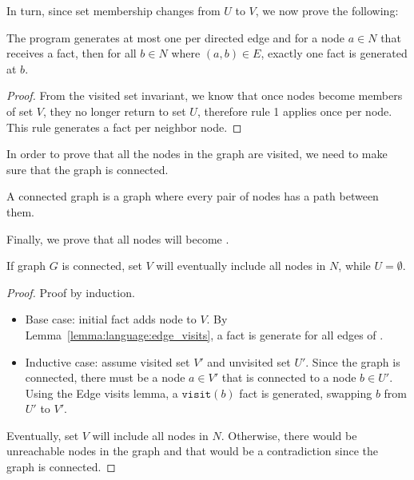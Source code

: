 In turn, since set membership changes from $U$ to $V$, we now prove the
following:

\noindent\begin{minipage}{\linewidth}
\begin{lemma}\label{lemma:language:edge_visits}
The program generates at most one  per directed edge and for a node
$a \in N$ that receives a  fact, then for all $b \in N$ where $(a,
b) \in E$, exactly one  fact is generated at $b$.
\end{lemma}
\end{minipage}
\begin{proof}
From the visited set invariant, we know that once nodes become members of set $V$,
they no longer return to set $U$, therefore rule 1 applies once per
node. This rule generates a  fact per neighbor node.
\end{proof}

In order to prove that all the nodes in the graph are visited, we need to make
sure that the graph is connected.

\begin{definition}
A connected graph is a graph where every pair of nodes has a path between them.
\end{definition}

Finally, we prove that all nodes will become .

\begin{theorem}
If graph $G$ is connected, set $V$ will eventually include all nodes in $N$,
while $U = \emptyset$.
\end{theorem}
\begin{proof}
Proof by induction.

\begin{itemize}

   \item Base case: initial fact  adds node  to $V$.
      By Lemma~\ref{lemma:language:edge_visits}, a  fact is generate
      for all edges of .

   \item Inductive case: assume visited set $V'$ and unvisited set $U'$.
  Since the graph
   is connected, there must be a node $a \in V'$ that is connected to a node $b
   \in U'$. Using the Edge visits lemma, a $\mathtt{visit}(b)$ fact is generated,
   swapping $b$ from $U'$ to $V'$.
\end{itemize}

Eventually, set $V$ will include all nodes in $N$. Otherwise, there would be
unreachable nodes in the graph and that would be a contradiction since the graph
is connected.
\end{proof}

